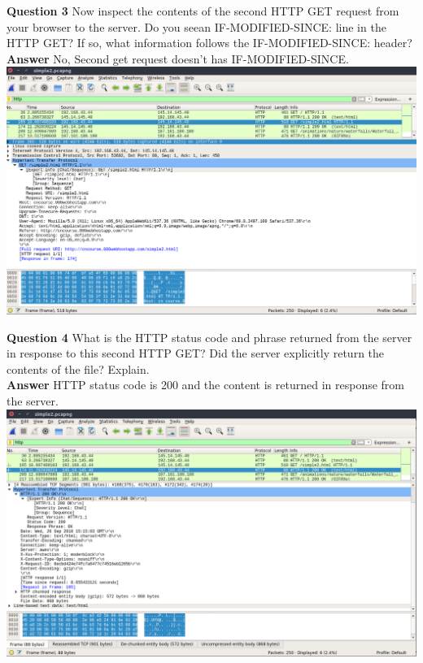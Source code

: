 \documentclass[14pt]{extarticle}
\begin{document}
    \noindent
    \textbf{\large Question 3}
    Now inspect the contents of the second HTTP GET request from your browser to the server.
    Do you seean IF-MODIFIED-SINCE: line in the HTTP GET? 
    If so, what information follows the IF-MODIFIED-SINCE: header?\\
    \textbf{\large Answer}
    No, Second get request doesn't has IF-MODIFIED-SINCE.\\[10pt]
    \includegraphics[scale=0.40]{1_10_1}\\[10pt]
    \vspace{1cm}

    \noindent
    \textbf{\large Question 4}
    What is the HTTP status code and phrase returned from the server in response to this second HTTP GET? 
    Did the server explicitly return the contents of the file?  Explain.\\
    \textbf{\large Answer}
    HTTP status code is 200 and the content is returned in response from the server.\\[10pt]
    \includegraphics[scale=0.40]{1_10_2}\\[10pt]
    \vspace{1cm}
\end{document}
